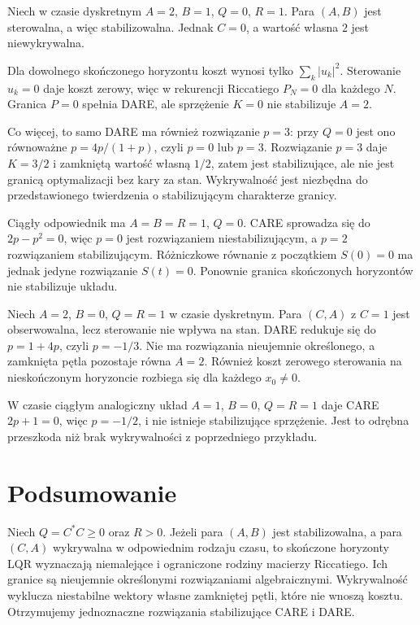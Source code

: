 \begin{przyklad}
\label{prz:lin26-no-detectability}
Niech w czasie dyskretnym
\(A=2\), \(B=1\),
\(Q=0\), \(R=1\).
Para \((A,B)\)
jest sterowalna,
a więc stabilizowalna.
Jednak \(C=0\),
a wartość własna \(2\)
jest niewykrywalna.

Dla dowolnego
skończonego horyzontu
koszt wynosi tylko
\(\sum_k|u_k|^2\).
Sterowanie \(u_k=0\)
daje koszt zerowy,
więc w rekurencji Riccatiego
\(P_N=0\) dla każdego \(N\).
Granica \(P=0\)
spełnia DARE,
ale sprzężenie \(K=0\)
nie stabilizuje \(A=2\).

Co więcej, to samo DARE
ma również rozwiązanie \(p=3\):
przy \(Q=0\) jest ono
równoważne
\(p=4p/(1+p)\),
czyli \(p=0\) lub \(p=3\).
Rozwiązanie \(p=3\)
daje \(K=3/2\)
i zamkniętą wartość własną
\(1/2\), zatem jest
stabilizujące,
ale nie jest granicą
optymalizacji
bez kary za stan.
Wykrywalność jest
niezbędna do
przedstawionego twierdzenia
o stabilizującym
charakterze granicy.

Ciągły odpowiednik
ma \(A=B=R=1\), \(Q=0\).
CARE sprowadza się do
\(2p-p^2=0\),
więc \(p=0\)
jest rozwiązaniem
niestabilizującym,
a \(p=2\)
rozwiązaniem stabilizującym.
Różniczkowe równanie
z początkiem \(S(0)=0\)
ma jednak jedyne
rozwiązanie \(S(t)=0\).
Ponownie granica
skończonych horyzontów
nie stabilizuje układu.
\end{przyklad}

\begin{przyklad}
\label{prz:lin26-no-stabilizability}
Niech \(A=2\), \(B=0\),
\(Q=R=1\) w czasie dyskretnym.
Para \((C,A)\) z \(C=1\)
jest obserwowalna,
lecz sterowanie
nie wpływa na stan.
DARE redukuje się
do \(p=1+4p\),
czyli \(p=-1/3\).
Nie ma rozwiązania
nieujemnie określonego,
a zamknięta pętla
pozostaje równa \(A=2\).
Również koszt zerowego
sterowania na nieskończonym
horyzoncie rozbiega się
dla każdego \(x_0\ne0\).

W czasie ciągłym
analogiczny układ
\(A=1\), \(B=0\),
\(Q=R=1\)
daje CARE \(2p+1=0\),
więc \(p=-1/2\),
i nie istnieje
stabilizujące sprzężenie.
Jest to odrębna przeszkoda
niż brak wykrywalności
z poprzedniego przykładu.
\end{przyklad}

\section{Podsumowanie}
\label{sec:lin26-summary}

Niech \(Q=C^*C\ge0\)
oraz \(R>0\).
Jeżeli para \((A,B)\)
jest stabilizowalna,
a para \((C,A)\)
wykrywalna w odpowiednim
rodzaju czasu, to skończone
horyzonty LQR wyznaczają
niemalejące i ograniczone
rodziny macierzy Riccatiego.
Ich granice są
nieujemnie określonymi
rozwiązaniami algebraicznymi.
Wykrywalność wyklucza
niestabilne wektory własne
zamkniętej pętli,
które nie wnoszą kosztu.
Otrzymujemy jednoznaczne
rozwiązania stabilizujące
CARE i DARE.

